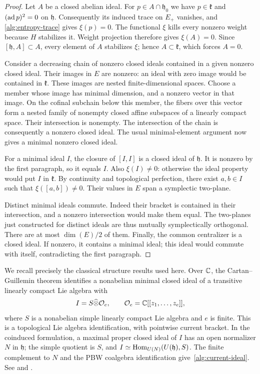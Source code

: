 \begin{proof}
Let $A$ be a closed abelian ideal. For $p\in A\cap\mathfrak h_0$ we
have $p\in\mathfrak k$ and $(\operatorname{ad} p)^2=0$ on $\mathfrak h$.
Consequently its induced trace on $E_+$ vanishes, and
\eqref{alg:entropy-trace} gives $\xi(p)=0$. The functional $\xi$ kills
every nonzero weight because $H$ stabilizes it. Weight projection
therefore gives $\xi(A)=0$. Since $[\mathfrak h,A]\subset A$, every
element of $A$ stabilizes $\xi$; hence $A\subset\mathfrak k$, which
forces $A=0$.

Consider a decreasing chain of nonzero closed ideals contained in a
given nonzero closed ideal. Their images in $E$ are nonzero: an ideal
with zero image would be contained in $\mathfrak k$. These images are
nested finite-dimensional spaces. Choose a member whose image has
minimal dimension, and a nonzero vector in that image. On the cofinal
subchain below this member, the fibers over this vector form a nested
family of nonempty closed affine subspaces of a linearly compact
space. Their intersection is nonempty. The intersection of the chain
is consequently a nonzero closed ideal. The usual minimal-element
argument now gives a minimal nonzero closed ideal.

For a minimal ideal $I$, the closure of $[I,I]$ is a closed ideal of
$\mathfrak h$. It is nonzero by the first paragraph, so it equals $I$.
Also $\xi(I)\ne0$: otherwise the ideal property would put $I$ in
$\mathfrak k$. By continuity and topological perfection, there exist
$a,b\in I$ such that $\xi([a,b])\ne0$. Their values in $E$ span a
symplectic two-plane.

Distinct minimal ideals commute. Indeed their bracket is contained
in their intersection, and a nonzero intersection would make them
equal. The two-planes just constructed for distinct ideals are thus
mutually symplectically orthogonal. There are at most $\dim(E)/2$ of
them. Finally, the common centralizer is a closed ideal. If nonzero,
it contains a minimal ideal; this ideal would commute with itself,
contradicting the first paragraph.
\end{proof}

We recall precisely the classical structure results used here. Over
$\mathbb C$, the Cartan--Guillemin theorem identifies a nonabelian minimal
closed ideal of a transitive linearly compact Lie algebra with
\begin{equation}
 I=S\widehat\otimes\mathcal O_e,
 \qquad
 \mathcal O_e=\mathbb C[[z_1,\ldots,z_e]],
 \label{alg:current-ideal}
\end{equation}
where $S$ is a nonabelian simple linearly compact Lie algebra and $e$
is finite. This is a topological Lie algebra identification, with
pointwise current bracket. In the coinduced formulation, a maximal
proper closed ideal of $I$ has an open normalizer $N$ in $\mathfrak h$;
the simple quotient is $S$, and
$I\simeq\operatorname{Hom}_{U(N)}(U(\mathfrak h),S)$. The finite complement to $N$
and the PBW coalgebra identification give~\eqref{alg:current-ideal}.
See \citet[Proposition~2.6, Theorem~2.7 and Corollary~2.8]{FattoriKac2002}
and \citet[Proposition~6.11]{BakalovDAndreaKac2001}.

